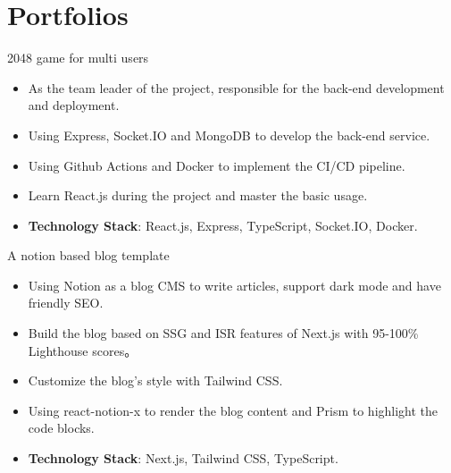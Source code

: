 \documentclass{resume}
\newcommand{\en}[1]{#1}
\newcommand{\zh}[1]{}
\begin{document}
\section{\en{Portfolios}\zh{个人项目}}
\en{}
\zh{\datedsubsection{\textbf{字节跳动前端训练营}}{2020/11 -- 2020/12}}
\en{2048 game for multi users}
\zh{2048 多人在线小游戏}
\begin{itemize}
  \item \en{As the team leader of the project, responsible for the back-end development and deployment.}
        \zh{作为项目的组长, 负责项目的后端开发以及前后端整合上线}
  \item \en{Using Express, Socket.IO and MongoDB to develop the back-end service.}
        \zh{使用 Express, Socket.IO 以及 MongoDB 进行后端开发}
  \item \en{Using Github Actions and Docker to implement the CI/CD pipeline.}
        \zh{使用 Github Actions 和 Docker 实现前后端的 CI/CD}
  \item \en{Learn React.js during the project and master the basic usage.}
        \zh{在项目中自学 React.js 并掌握基本使用}
  \item \en{\textbf{Technology Stack}: React.js, Express, TypeScript, Socket.IO, Docker.}
        \zh{\textbf{技术栈}: React.js, Express, TypeScript, Socket.IO, Docker}
\end{itemize}
\en{A notion based blog template}
\zh{基于 Notion 的个人博客模板}
\begin{itemize}
  \item \en{Using Notion as a blog CMS to write articles, support dark mode and have friendly SEO.}
        \zh{使用 Notion 作为 CMS 发表博客，支持黑暗模式和良好的 SEO}
  \item \en{Build the blog based on SSG and ISR features of Next.js with 95-100\% Lighthouse scores。}
        \zh{基于 Next.js 的 SSG 和 ISR 特性构建博客，LightHouse 评分高达 95-100\%}
  \item \en{Customize the blog's style with Tailwind CSS.}
        \zh{使用 Tailwind CSS 定制化博客的样式}
  \item \en{Using react-notion-x to render the blog content and Prism to highlight the code blocks.}
        \zh{使用 react-notion-x 渲染博客内容，使用 Prism 对代码块进行高亮}
  \item \en{\textbf{Technology Stack}: Next.js, Tailwind CSS, TypeScript.}
        \zh{\textbf{技术栈}: Next.js, Tailwind CSS, TypeScript}
\end{itemize}
\end{document}
